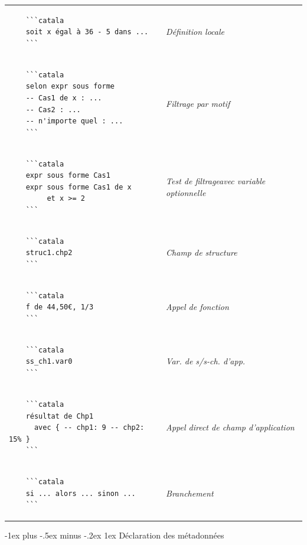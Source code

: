 \documentclass{article}
\makeatletter
\newcommand\articlenormalsize{\fontsize{10pt}{12pt}\selectfont}
\renewcommand{\section}{\@startsection{section}{1}{0mm}%
                                {-1ex plus -.5ex minus -.2ex}%
                                {1ex}%
                                {\normalfont\articlenormalsize\bfseries}}
\newenvironment{catala}{%
  \VerbatimEnvironment
  \let\FV@ListVSpace\relax
  \begin{verbatim}}%
 {\end{verbatim}}
\makeatother
\begin{document}
\begin{multicols}{3}
\begin{tabular}{@{}p{\cola}>{\slshape}p{\colb}@{}}
  \begin{catala}
    ```catala
    soit x égal à 36 - 5 dans ...
    ```
  \end{catala}
  & Définition locale
  \\
  \begin{catala}
    ```catala
    selon expr sous forme
    -- Cas1 de x : ...
    -- Cas2 : ...
    -- n'importe quel : ...
    ```
  \end{catala}
  & Filtrage par motif
  \\
  \begin{catala}
    ```catala
    expr sous forme Cas1
    expr sous forme Cas1 de x
         et x >= 2
    ```
  \end{catala}
  & Test de filtrage\newline avec variable optionnelle
  \\
  \begin{catala}
    ```catala
    struc1.chp2
    ```
  \end{catala}
  & Champ de structure
  \\
  \begin{catala}
    ```catala
    f de 44,50€, 1/3
    ```
  \end{catala}
  & Appel de fonction
  \\
  \begin{catala}
    ```catala
    ss_ch1.var0
    ```
  \end{catala}
  & Var. de s/s-ch. d'app.
  \\
  \begin{catala}
    ```catala
    résultat de Chp1
      avec { -- chp1: 9 -- chp2: 15%
    ```
  \end{catala}
  & Appel direct de champ d'application
  \\
  \begin{catala}
    ```catala
    si ... alors ... sinon ...
    ```
  \end{catala}
  & Branchement
  \\
\end{tabular}

\section{Déclaration des métadonnées}

\begin{tabular}{@{}p{\cola}>{\slshape}p{\colb}@{}}


\end{tabular}
\end{multicols}
\end{document}
